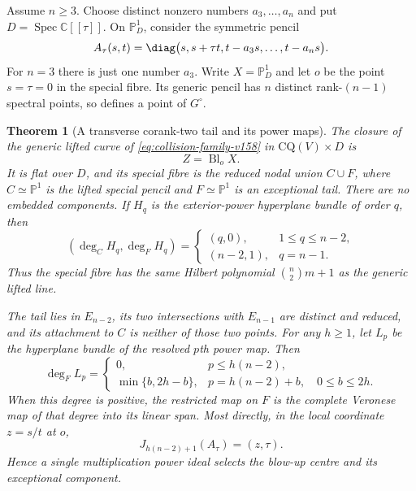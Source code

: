 \documentclass[11pt,reqno]{amsart}
\numberwithin{equation}{section}
\newtheorem{theorem}{Theorem}[section]
\theoremstyle{definition}\newtheorem{definition}[theorem]{Definition}
\theoremstyle{remark}\newtheorem{remark}[theorem]{Remark}
\newcommand{\C}{\mathbb C}\newcommand{\Q}{\mathbb Q}
\newcommand{\Pj}{\mathbb P}\newcommand{\A}{\mathbb A}
\DeclareMathOperator{\Spec}{Spec}\DeclareMathOperator{\PGL}{PGL}
\begin{document}
Assume $n\geq3$. Choose distinct nonzero numbers $a_3,\ldots,a_n$ and put
$D=\Spec\C[[\tau]]$. On $\Pj^1_D$, consider the symmetric pencil
\begin{equation}\label{eq:collision-family-v158}
 A_\tau(s,t)=\diag\bigl(s,s+\tau t,
                           t-a_3s,\ldots,t-a_ns\bigr).
\end{equation}
For $n=3$ there is just one number $a_3$. Write $X=\Pj^1_D$ and let
$o$ be the point $s=\tau=0$ in the special fibre. Its generic pencil
has $n$ distinct rank-$(n-1)$ spectral points, so defines a point of
$G^\circ$.

\begin{theorem}[A transverse corank-two tail and its power maps]
\label{thm:hilbert-tail-v158}
The closure of the generic lifted curve of
\eqref{eq:collision-family-v158} in $\mathrm{CQ}(V)\times D$ is
\begin{equation}\label{eq:tail-blowup-v158}
                         Z=\operatorname{Bl}_o X.
\end{equation}
It is flat over $D$, and its special fibre is the reduced nodal union
$C\cup F$, where $C\simeq\Pj^1$ is the lifted special pencil and
$F\simeq\Pj^1$ is an exceptional tail. There are no embedded components.
If $H_q$ is the exterior-power hyperplane bundle of order $q$, then
\begin{equation}\label{eq:tail-degrees-v158}
 (\deg_C H_q,\deg_F H_q)=
 \begin{cases}(q,0),&1\leq q\leq n-2,\\
              (n-2,1),&q=n-1.
 \end{cases}
\end{equation}
Thus the special fibre has the same Hilbert polynomial
$\binom n2m+1$ as the generic lifted line.

The tail lies in $E_{n-2}$, its two intersections with $E_{n-1}$
are distinct and reduced, and its attachment to $C$ is neither of
those two points. For any $h\geq1$, let $L_p$ be the hyperplane
bundle of the resolved $p$th power map. Then
\begin{equation}\label{eq:tail-power-degree-v158}
 \deg_F L_p=
 \begin{cases}
 0,&p\leq h(n-2),\\
 \min\{b,2h-b\},&p=h(n-2)+b,\quad 0\leq b\leq2h.
 \end{cases}
\end{equation}
When this degree is positive, the restricted map on $F$ is the
complete Veronese map of that degree into its linear span.
Most directly, in the local coordinate $z=s/t$ at $o$,
\begin{equation}\label{eq:one-power-centre-v158}
 J_{h(n-2)+1}(A_\tau)=(z,\tau).
\end{equation}
Hence a single multiplication power ideal selects the blow-up centre
and its exceptional component.
\end{theorem}
\end{document}
